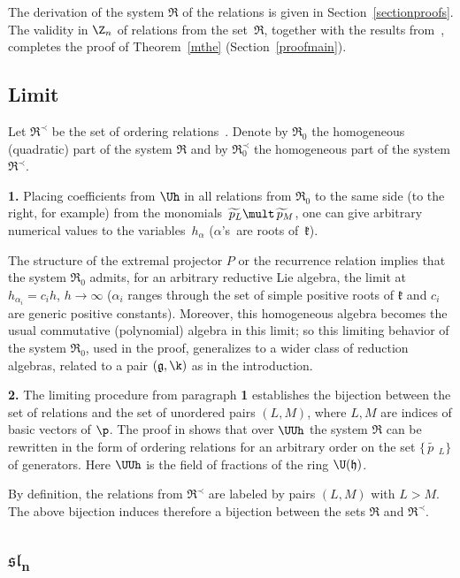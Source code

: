 \documentclass[pdftex]{sigma}
\def\f{\mathfrak{k}}\def\h{\mathfrak{h}}\def\hs{\mathring{z}}\def\g{\mathfrak{g}}\def\sl{\mathfrak{sl}}\def\gl{\mathfrak{gl}}
\def\pp{\widetilde{\phantom{\,}p\phantom{\,}\phantom{\ }}\phantom{\!}\phantom{\!}\phantom{\!}}
\numberwithin{equation}{section}
\begin{document}
The derivation of the system $\mathfrak{R}$ of the relations is given in Section~\ref{sectionproofs}. The validity in $\Z_n$ of relations from the
set~$\mathfrak{R}$, together with the results
from~\cite{KO3}, completes the proof of Theorem~\ref{mthe} (Section~\ref{proofmain}).

\subsection{Limit}\label{seclimit}

Let $\mathfrak{R}^\prec$ be the set of ordering relations~.
Denote by ${\mathfrak R}_0$ the homogeneous (quadratic) part of the system ${\mathfrak R}$ and by $\mathfrak{R}^\prec_0$ the
homogeneous part of the system $\mathfrak{R}^\prec$.

{\bf 1.} Placing coef\/f\/icients from $\Uh$ in all relations from $\mathfrak{R}_0$ to the same side (to the right, for example) from the monomials
$\pp_L\mult\pp_M$, one can give arbitrary numerical values to the variables~$h_\alpha$ ($\alpha$'s~are roots of~$\f$).


The structure of the extremal  projector $P$ or the recurrence relation   implies that the system ${\mathfrak R}_0$ admits, for an arbitrary
reductive Lie algebra, the limit at $h_{\alpha_i}=c_i h$, $h\rightarrow\infty$ ($\alpha_i$ ranges through the set of simple positive
roots of  $\f$ and $c_i$ are generic positive constants). Moreover, this homogeneous algebra becomes the usual commutative (polynomial) algebra in
this limit; so this limiting behavior of the system $\mathfrak{R}_0$, used in the proof, generalizes to a wider class of reduction algebras, related to a pair $(\g,\k)$ as in the introduction.

{\bf 2.} The limiting procedure from paragraph {\bf 1} establishes the bijection between the set of relations and the set of
unordered pairs $(L,M)$, where $L,M$ are indices of basic vectors of $\p$.
 The proof in \cite{KO3} shows that over  $\UUh$ the system $\mathfrak{R}$ can be rewritten
in the form of ordering relations for an arbitrary order on the set $\{\pp_L\}$ of generators. Here $\UUh$ is  the f\/ield of fractions of the ring $\U (\h )$.


 By def\/inition, the relations from $\mathfrak{R}^\prec$ are labeled by pairs $(L,M)$
with $L>M$. The above bijection induces therefore a bijection between the sets $\mathfrak{R}$ and $\mathfrak{R}^\prec$.

\subsection[$\sl_n$]{$\boldsymbol{\sl_n}$}\label{subsection_sl_n}
\end{document}
